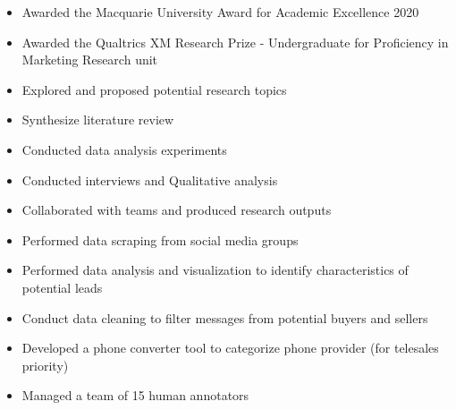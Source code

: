 \documentclass[10pt,a4paper,ragged2e]{altacv}
\begin{document}



\makecvheader



\begin{paracol}{2}



\begin{itemize}
	\item Awarded the Macquarie University Award for Academic Excellence 2020
	\item Awarded the Qualtrics XM Research Prize - Undergraduate for Proficiency in Marketing Research unit
\end{itemize}



\begin{itemize}
	\item Explored and proposed potential research topics
	\item Synthesize literature review
	\item Conducted data analysis experiments
	\item Conducted interviews and Qualitative analysis
	\item Collaborated with teams and produced research outputs
\end{itemize}

\divider

\begin{itemize}
	\item Performed data scraping from social media groups
	\item Performed data analysis and visualization to identify characteristics of potential leads
	\item Conduct data cleaning to filter messages from potential buyers and sellers
	\item Developed a phone converter tool to categorize phone provider (for telesales priority)
	\item Managed a team of 15 human annotators
\end{itemize}


\end{paracol}
\end{document}
